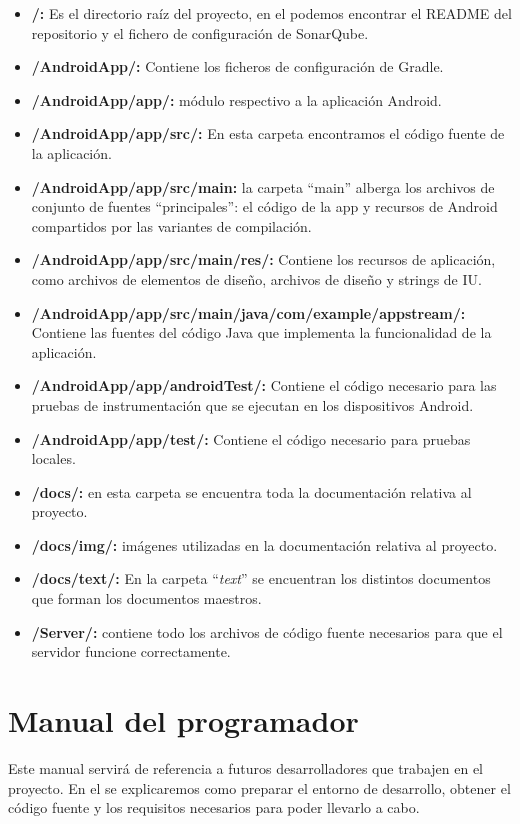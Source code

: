 \begin{itemize}
\item
	\textbf{/:} Es el directorio raíz del proyecto, en el podemos encontrar el README del repositorio y el fichero de configuración de SonarQube.
\item
	\textbf{/AndroidApp/:} Contiene los ficheros de configuración de Gradle.
\item
	\textbf{/AndroidApp/app/:} módulo respectivo a la aplicación Android.
\item
	\textbf{/AndroidApp/app/src/:} En esta carpeta encontramos el código fuente de la aplicación.
\item
	\textbf{/AndroidApp/app/src/main:} la carpeta ``main'' alberga los archivos de conjunto de fuentes ``principales'': el código de la app y recursos de Android compartidos por las variantes de compilación.
\item
	\textbf{/AndroidApp/app/src/main/res/:} Contiene los recursos de aplicación, como archivos de elementos de diseño, archivos de diseño y strings de IU.
\item
	\textbf{/AndroidApp/app/src/main/java/com/example/appstream/:} Contiene las fuentes del código Java que implementa la funcionalidad de la aplicación.
\item
	\textbf{/AndroidApp/app/androidTest/:} Contiene el código necesario para las pruebas de instrumentación que se ejecutan en los dispositivos Android.
\item
	\textbf{/AndroidApp/app/test/:} Contiene el código necesario para pruebas locales.
\item
	\textbf{/docs/:} en esta carpeta se encuentra toda la documentación relativa al proyecto.
\item
	\textbf{/docs/img/:} imágenes utilizadas en la documentación relativa al proyecto.
\item
	\textbf{/docs/text/:} En la carpeta ``\textit{text}'' se encuentran los distintos documentos que forman los documentos maestros.
\item
	\textbf{/Server/:} contiene todo los archivos de código fuente necesarios para que el servidor funcione correctamente.
\end{itemize}

\section{Manual del programador}

Este manual servirá de referencia a futuros desarrolladores que trabajen en el proyecto. En el se explicaremos como preparar el entorno de desarrollo, obtener el código fuente y los requisitos necesarios para poder llevarlo a cabo.

